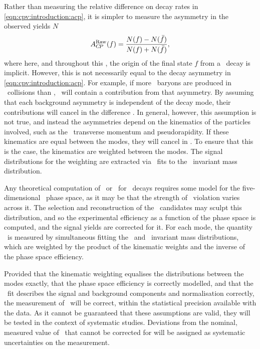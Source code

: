 Rather than measuring the relative difference on decay rates in 
\cref{eqn:cpv:introduction:acp}, it is simpler to measure the asymmetry in the 
observed yields $N$
\begin{equation*}
  A_{C\!P}^{\textnormal{Raw}}(f) = \frac{N(f) - N(\bar{f})}{N(f) + N(\bar{f})},
\end{equation*}
where here, and throughout this , the origin of the final 
state $f$ from a \PLambdac\ decay is implicit.
However, this is not necessarily equal to the decay asymmetry in 
\cref{eqn:cpv:introduction:acp}.
For example, if more \PLambdab\ baryons are produced in \pp\ collisions than 
\APLambdab, \ARaw\ will contain a contribution from that asymmetry.
By assuming that each background asymmetry is independent of the decay mode, 
their contributions will cancel in the difference \dACP\@.
In general, however, this assumption is not true, and instead the asymmetries 
depend on the kinematics of the particles involved, such as the \PLambdab\ 
transverse momentum and pseudorapidity.
If these kinematics are equal between the modes, they will cancel in \dACP\@.
To ensure that this is the case, the kinematics are weighted between the modes.
The signal distributions for the weighting are extracted via \chisq\ fits to 
the \phh\ invariant mass distribution.

Any theoretical computation of \ACP\ or \dACP\ for \LcTophh\ decays requires 
some model for the five-dimensional \phh\ phase space, as it may be that the 
strength of \CP\ violation varies across it.
The selection and reconstruction of the \PLambdac\ candidates may sculpt this 
distribution, and so the experimental efficiency as a function of the phase 
space is computed, and the signal yields are corrected for it.
For each mode, the quantity \ARaw\ is measured by simultaneous fitting the 
\PLambdac\ and \APLambdac\ invariant mass distributions, which are weighted by 
the product of the kinematic weights and the inverse of the phase space 
efficiency.

Provided that the kinematic weighting equalises the distributions between the 
modes exactly, that the phase space efficiency is correctly modelled, and that 
the \chisq\ fit describes the signal and background components and 
normalisation correctly, the measurement of \dACP\ will be correct, within the 
statistical precision available with the data.
As it cannot be guaranteed that these assumptions are valid, they will be 
tested in the context of systematic studies.
Deviations from the nominal, measured value of \dACP\ that cannot be corrected 
for will be assigned as systematic uncertainties on the measurement.

